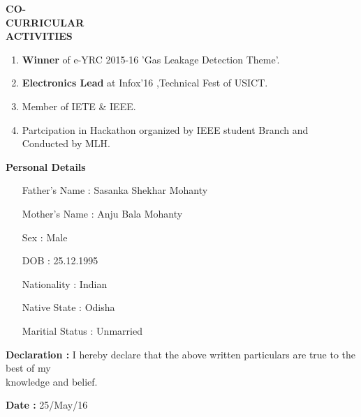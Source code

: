 \documentclass[11pt]{article}
\begin{document}
\begin{flushleft}
{\Large \bf{CO-\\CURRICULAR\\ ACTIVITIES}}
\begin{enumerate}
\addtolength{\itemindent}{1.55in}
\vspace{-0.75in} 
\item {\bf Winner} of e-YRC 2015-16 'Gas Leakage Detection Theme'.
\item {\bf Electronics Lead} at Infox'16 ,Technical Fest of USICT.
\item Member of IETE \& IEEE.
\item Partcipation in Hackathon organized by IEEE student Branch and \\ \hspace{1.55in}Conducted by MLH. 
\end{enumerate}
\end{flushleft}  

\begin{flushleft}
{\Large \bf{Personal Details}}
\begin{enumerate}
\addtolength{\itemindent}{2.2in}
\item[Father's Name : ] Sasanka Shekhar Mohanty	
\item[Mother's Name : ] Anju Bala Mohanty	
\item[Sex : ] Male	
\item[DOB : ] 25.12.1995	
\item[Nationality : ] Indian
\item[Native State : ] Odisha
\item[Maritial Status : ] Unmarried
\end{enumerate}
\end{flushleft}  

\begin{flushleft}
{\Large\bf Declaration : }
 I hereby declare that the above written particulars are true to the best of my \\
\hspace{1.38in}
knowledge and belief.
\end{flushleft}


\begin{flushleft}
{\Large\bf Date : }\hspace{1.7cm} {25/May/16 }
\end{flushleft}
\end{document}
